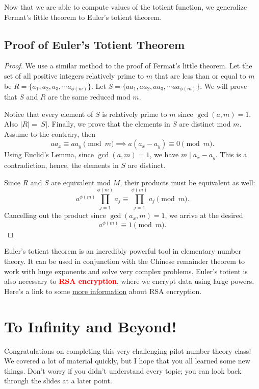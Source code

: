 Now that we are able to compute values of the totient function, we generalize Fermat's little theorem to Euler's totient theorem.
\clearpage

\subsection{Proof of Euler's Totient Theorem}
\begin{proof} We use a similar method to the proof of Fermat's little theorem. Let the set of all positive integers relatively prime to $m$ that are less than or equal to $m$ be $R=\{a_1, a_2, a_3, \cdots a_{\phi(m)}\}$. Let $S=\{aa_1, aa_2, aa_3, \cdots aa_{\phi(m)}\}$. We will prove that $S$ and $R$ are the same reduced mod $m$. \clearpage
	
Notice that every element of $S$ is relatively prime to $m$ since $\gcd(a, m)=1$. Also $|R|=|S|$. Finally, we prove that the elements in $S$ are distinct mod $m$. Assume to the contrary, then $$aa_x\equiv aa_y\pmod{m}\implies a(a_x-a_y)\equiv 0\pmod{m}.$$ Using Euclid's Lemma, since $\gcd(a, m)=1$, we have $m\mid a_x-a_y$. This is a contradiction, hence, the elements in $S$ are distinct. 

Since $R$ and $S$ are equivalent mod $M$, their products must be equivalent as well: $$a^{\phi(m)}\prod_{j=1}^{\phi(m)}a_j\equiv \prod_{j=1}^{\phi(m)}a_j \pmod{m}.$$ 
Cancelling out the product since $\gcd(a_x, m)=1$, we arrive at the desired $$a^{\phi(m)}\equiv 1\pmod{m}.$$
\end{proof}

Euler's totient theorem is an incredibly powerful tool in elementary number theory. It can be used in conjunction with the Chinese remainder theorem to work with huge exponents and solve very complex problems. Euler's totient is also necessary to \textbf{\textcolor{red}{RSA encryption}}, where we encrypt data using large powers. Here's a link to some \href{https://simple.wikipedia.org/wiki/RSA_(algorithm)}{more information} about RSA encryption.
\clearpage  

\section{To Infinity and Beyond!}

Congratulations on completing this very challenging pilot number theory class! We covered a lot of material quickly, but I hope that you all learned some new things. Don't worry if you didn't understand every topic; you can look back through the slides at a later point. 

